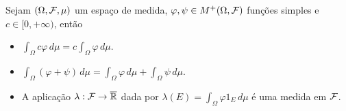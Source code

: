 \begin{lema}\label{lema-lin-int-funcao-simples-positiva}
Sejam $(\Omega,\mathcal{F},\mu)$ um espaço de medida, 
$\varphi,\psi \in M^+(\Omega,\mathcal{F})$ 
funções simples e $c\in [0,+\infty)$,
então
\begin{itemize}
	\item[a)]
	\(\displaystyle 
		\int_{\Omega} c\varphi\, d\mu
		=
		c\int_{\Omega} \varphi \, d\mu.
	\)
	

	\item[b)]
	\(\displaystyle 
		\int_{\Omega} (\varphi+\psi)\, d\mu
		=
		\int_{\Omega} \varphi \, d\mu
		+
		\int_{\Omega} \psi \, d\mu.
	\)
	
	\item[c)] A aplicação $\lambda:\mathcal{F}\to\overline{\mathbb{R}}$
	dada por 
		\(\displaystyle
			\lambda(E) = \int_{\Omega} \varphi 1_{E}\, d\mu
		\)
	é uma medida em $\mathcal{F}$.
\end{itemize}
\end{lema}



